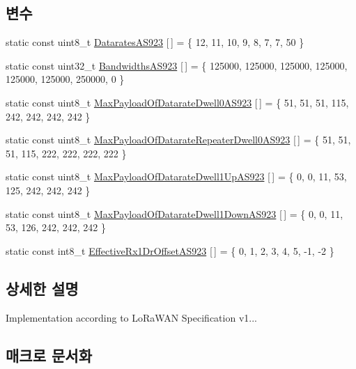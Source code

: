\subsection*{변수}
\begin{DoxyCompactItemize}
\item 
static const uint8\+\_\+t \mbox{\hyperlink{group___r_e_g_i_o_n_a_s923_gacf4d2f14a2de1119173ca9da02d446cf}{Datarates\+A\+S923}} \mbox{[}$\,$\mbox{]} = \{ 12, 11, 10, 9, 8, 7, 7, 50 \}
\item 
static const uint32\+\_\+t \mbox{\hyperlink{group___r_e_g_i_o_n_a_s923_ga38ad3de1f1f256044b1ab27bae713dd3}{Bandwidths\+A\+S923}} \mbox{[}$\,$\mbox{]} = \{ 125000, 125000, 125000, 125000, 125000, 125000, 250000, 0 \}
\item 
static const uint8\+\_\+t \mbox{\hyperlink{group___r_e_g_i_o_n_a_s923_gab96d460a66ef00fa26bc68bb74a3f9b6}{Max\+Payload\+Of\+Datarate\+Dwell0\+A\+S923}} \mbox{[}$\,$\mbox{]} = \{ 51, 51, 51, 115, 242, 242, 242, 242 \}
\item 
static const uint8\+\_\+t \mbox{\hyperlink{group___r_e_g_i_o_n_a_s923_gae64f6770c6c2c0a11eed56002ed3991a}{Max\+Payload\+Of\+Datarate\+Repeater\+Dwell0\+A\+S923}} \mbox{[}$\,$\mbox{]} = \{ 51, 51, 51, 115, 222, 222, 222, 222 \}
\item 
static const uint8\+\_\+t \mbox{\hyperlink{group___r_e_g_i_o_n_a_s923_ga4c06b82286a6f12c7b31022b3068a290}{Max\+Payload\+Of\+Datarate\+Dwell1\+Up\+A\+S923}} \mbox{[}$\,$\mbox{]} = \{ 0, 0, 11, 53, 125, 242, 242, 242 \}
\item 
static const uint8\+\_\+t \mbox{\hyperlink{group___r_e_g_i_o_n_a_s923_ga94c244742090896403b892f3a59d1e0d}{Max\+Payload\+Of\+Datarate\+Dwell1\+Down\+A\+S923}} \mbox{[}$\,$\mbox{]} = \{ 0, 0, 11, 53, 126, 242, 242, 242 \}
\item 
static const int8\+\_\+t \mbox{\hyperlink{group___r_e_g_i_o_n_a_s923_ga3a2331ae7da40cfab59ef266f3ef6eda}{Effective\+Rx1\+Dr\+Offset\+A\+S923}} \mbox{[}$\,$\mbox{]} = \{ 0, 1, 2, 3, 4, 5, -\/1, -\/2 \}
\end{DoxyCompactItemize}


\subsection{상세한 설명}
Implementation according to Lo\+Ra\+W\+AN Specification v1... 

\subsection{매크로 문서화}
\mbox{\label{group___r_e_g_i_o_n_a_s923_gae069e1d35da1a7303a5242bbada80740}} 
